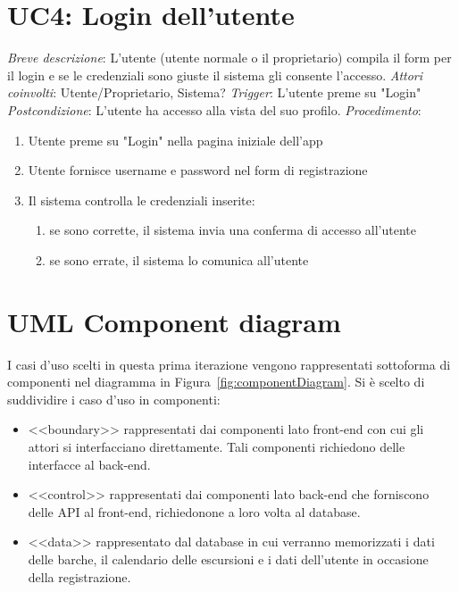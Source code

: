 \section{UC4: Login dell'utente}
\noindent \emph{Breve descrizione}: L'utente (utente normale o il proprietario) compila il form per il login e se le credenziali sono giuste il sistema gli consente l'accesso.\medbreak
\noindent \emph{Attori coinvolti}: Utente/Proprietario, Sistema?\medbreak
\noindent \emph{Trigger}: L'utente preme su "Login"\medbreak
\noindent \emph{Postcondizione}: L'utente ha accesso alla vista del suo profilo.\medbreak
\noindent \emph{Procedimento}:
\begin{enumerate}
    \item Utente preme su "Login" nella pagina iniziale dell'app
    \item Utente fornisce username e password nel form di registrazione
    \item Il sistema controlla le credenziali inserite:
          \begin{enumerate}
              \item se sono corrette, il sistema invia una conferma di accesso all'utente
              \item se sono errate, il sistema lo comunica all'utente
          \end{enumerate}
\end{enumerate}

\section{UML Component diagram}
I casi d'uso scelti in questa prima iterazione vengono rappresentati sottoforma di componenti nel diagramma in Figura~\ref{fig:componentDiagram}.
Si è scelto di suddividire i caso d'uso in componenti:

\begin{itemize}
    \item <<boundary>> rappresentati dai componenti lato front-end con cui gli attori si interfacciano direttamente. Tali componenti richiedono delle interfacce al back-end.
    \item <<control>> rappresentati dai componenti lato back-end che forniscono delle API al front-end, richiedonone a loro volta al database.
    \item <<data>> rappresentato dal database in cui verranno memorizzati i dati delle barche, il calendario delle escursioni e i dati dell'utente in occasione della registrazione.
\end{itemize}

